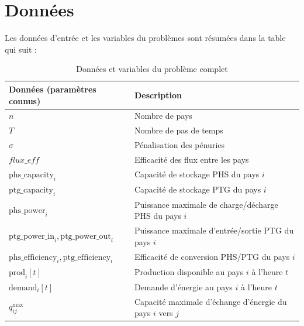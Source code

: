 \documentclass[12pt,a4paper]{article}
\begin{document}
\section{Données}

Les données d'entrée et les variables du problèmes sont résumées dans la table qui suit :

\begin{table}[H]
\centering
\caption{Données et variables du problème complet}
\vspace{0.2 cm}
\begin{tabularx}{\textwidth}{lX}
\toprule
\textbf{Données (paramètres connus)} & \textbf{Description} \\ 
\midrule
$n$ & Nombre de pays \\
\addlinespace
$T$ & Nombre de pas de temps \\
\addlinespace
$\sigma$ & Pénalisation des pénuries \\
\addlinespace
$flux\_eff$ & Efficacité des flux entre les pays \\
\addlinespace
$\mathrm{phs\_capacity}_i$ & Capacité de stockage PHS du pays $i$ \\
\addlinespace
$\mathrm{ptg\_capacity}_i$ & Capacité de stockage PTG du pays $i$ \\
\addlinespace
$\mathrm{phs\_power}_i$ & Puissance maximale de charge/décharge PHS du pays $i$ \\
\addlinespace
$\mathrm{ptg\_power\_in}_i, \mathrm{ptg\_power\_out}_i$ & Puissance maximale d'entrée/sortie PTG du pays $i$ \\
\addlinespace
$\mathrm{phs\_efficiency}_i, \mathrm{ptg\_efficiency}_i$ & Efficacité de conversion PHS/PTG du pays $i$ \\
\addlinespace
$\mathrm{prod}_i[t]$ & Production disponible au pays $i$ à l'heure $t$ \\
\addlinespace
$\mathrm{demand}_i[t]$ & Demande d'énergie au pays $i$ à l'heure $t$ \\
\addlinespace
$q_{ij}^{\max}$ & Capacité maximale d'échange d'énergie du pays $i$ vers $j$ \\
\bottomrule
\end{tabularx}
\end{table}
\end{document}
